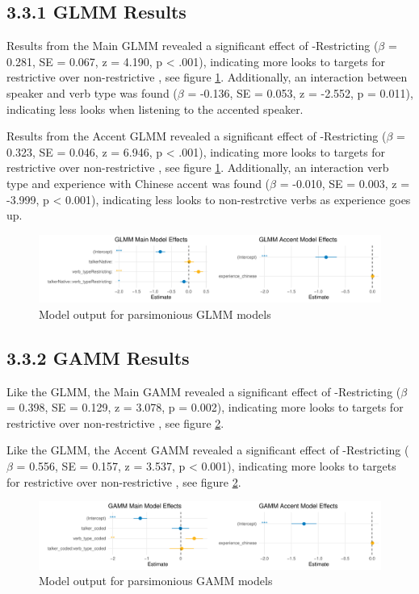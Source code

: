 \subsection{3.3.1 GLMM Results}
Results from the Main GLMM revealed a significant effect of  -Restricting  ($\beta$ = 0.281, SE = 0.067, z = 4.190, p < .001), indicating more looks to targets for restrictive  over non-restrictive , see figure \ref{fig:GLMM_cow_model}. Additionally, an interaction between speaker and verb type was found ($\beta$ = -0.136, SE = 0.053, z = -2.552, p = 0.011), indicating less looks when listening to the accented speaker.

Results from the Accent GLMM revealed a significant effect of  -Restricting  ($\beta$ = 0.323, SE = 0.046, z = 6.946, p < .001), indicating more looks to targets for restrictive  over non-restrictive , see figure \ref{fig:GLMM_cow_model}. Additionally, an interaction verb type and experience with Chinese accent was found ($\beta$ = -0.010, SE = 0.003, z = -3.999, p < 0.001), indicating less looks to non-restrctive verbs as experience goes up.

\begin{figure}[H]
    \centering
    \includegraphics[width=\textwidth]{figures/GLMM_cow_model.pdf}
    \caption{Model output for parsimonious GLMM models}
    \label{fig:GLMM_cow_model}
\end{figure}

\subsection{3.3.2 GAMM Results}

Like the GLMM, the Main GAMM revealed a significant effect of -Restricting ($\beta$ = 0.398, SE = 0.129, z = 3.078, p = 0.002), indicating more looks to targets for restrictive  over non-restrictive , see figure \ref{fig:GAMM_cow_model}.

Like the GLMM, the Accent GAMM revealed a significant effect of -Restricting ($\beta$ = 0.556, SE = 0.157, z = 3.537, p < 0.001), indicating more looks to targets for restrictive  over non-restrictive , see figure \ref{fig:GAMM_cow_model}.

\begin{figure}[H]
    \centering
    \includegraphics[width=\textwidth]{figures/GAMM_cow_model.pdf}
    \caption{Model output for parsimonious GAMM models}
    \label{fig:GAMM_cow_model}
\end{figure}
